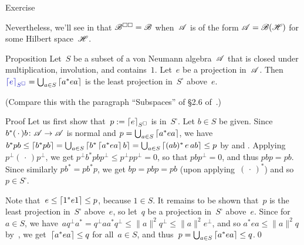 \documentclass[a]{subfiles}
\begin{document}
\begin{parsec}
\begin{point}{Exercise}
\begin{enumerate}
Nevertheless,
we'll see in  that $\mathscr{B}^{\square\square}=\mathscr{B}$
when~$\mathscr{A}$ is of the form $\mathscr{A}=\mathscr{B}(\mathscr{H})$
for some Hilbert space~$\mathscr{H}$.
\end{enumerate}
\end{point}
\begin{point}{Proposition}%
Let~$S$ be a subset of a von Neumann algebra~$\mathscr{A}$
that is closed under multiplication, involution, and contains~$1$.
Let~$e$ be a projection in~$\mathscr{A}$.
Then $\Define{\ceil{e}_{S^\square}}= 
\bigcup_{a\in S} \ceil{a^* e a}$
is the least projection in~$S^\square$
above~$e$.

(Compare this with the paragraph ``Subspaces'' of \S2.6 of~\cite{kr}.)
\begin{point}{Proof}%
Let us first show that~$p:= \left\lceil e\right\rceil_{S^\square}$
is in~$S^\square$.
Let $b\in S$ be given.
Since~$b^*(\,\cdot\,)b\colon \mathscr{A}\to\mathscr{A}$
is normal and $p=\bigcup_{a\in S} \left\lceil a^*ea\right\rceil$,
we have $b^*pb\leq \left\lceil b^*pb\right\rceil = 
\bigcup_{a\in S} \left\lceil b^* \left\lceil a^* e a\right\rceil b \right\rceil
= \bigcup_{a\in S} \left\lceil(ab)^* \,e\, ab\right\rceil \leq p$
by \TODO{} and \TODO{}.
Applying $p^\perp(\,\cdot\,)p^\perp$,
we get $p^\perp b^*pb p^\perp 
\leq p^\perp p p^\perp = 0$,
so that $pbp^\perp=0$,
and thus $pbp=pb$.
Since similarly $pb^* =pb^*p$,
we get  $bp=pbp=pb$
(upon applying~$(\,\cdot\,)^*$) and so~$p\in S^\square$.

Note that~$e\leq \left\lceil1^* e 1\right\rceil\leq p$, because $1\in S$.
It remains to be shown that~$p$ is the least projection in~$S^\square$
above~$e$, so let~$q$ be a projection in~$S^\square$ above~$e$.
Since for~$a\in S$,
we have~$aq^\perp a^*=  q^\perp aa^* q^\perp 
\leq \|a\|^2q^\perp \leq \|a\|^2e^\perp$,
and so $a^*ea\leq \|a\|^2q$ by~\TODO{},
we get~$\left\lceil a^*ea\right\rceil\leq q$
for all~$a\in S$,
and thus~$p=\bigcup_{a\in S}\left\lceil a^*ea\right\rceil \leq q$.\qed
\end{point}
\end{point}


\end{parsec}
\end{document}
